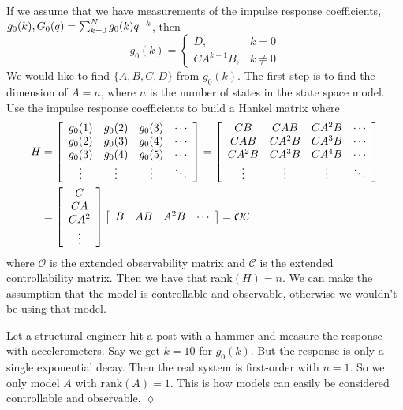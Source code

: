 If we assume that we have measurements of the impulse response coefficients, $g_0(k), G_0(q)=\sum_{k=0}^N g_0(k)q^{-k}$, then
$$g_0(k) = \begin{cases} D, & k=0 \\ CA^{k-1}B, & k\neq0 \end{cases}$$
We would like to find $\{A,B,C,D\}$ from $g_0(k)$. The first step is to find the dimension of $A=n$, where $n$ is the number of states in the state space model. Use the impulse response coefficients to build a Hankel matrix where
\begin{align*}
H &= \left[\begin{array}{c c c c} g_0(1) & g_0(2) & g_0(3) & \cdots \\ g_0(2) & g_0(3) & g_0(4) & \cdots \\ g_0(3) & g_0(4) & g_0(5) & \cdots \\ \vdots & \vdots & \vdots & \ddots \end{array}\right]
= \left[\begin{array}{c c c c} CB & CAB & CA^2B & \cdots \\ CAB & CA^2B & CA^3B & \cdots \\ CA^2B & CA^3B & CA^4B & \cdots \\ \vdots & \vdots & \vdots & \ddots \end{array}\right] \\
&= \left[\begin{array}{c} C \\ CA \\ CA^2 \\ \vdots \end{array}\right] \left[\begin{array}{c c c c} B & AB & A^2B & \cdots \end{array}\right] = \mathcal{O}\mathcal{C}
\end{align*}
where $\mathcal{O}$ is the extended observability matrix and $\mathcal{C}$ is the extended controllability matrix. Then we have that $\text{rank}(H)=n$. We can make the assumption that the model is controllable and observable, otherwise we wouldn't be using that model.

\begin{example}
Let a structural engineer hit a post with a hammer and measure the response with accelerometers. Say we get $k=10$ for $g_0(k)$. But the response is only a single exponential decay. Then the real system is first-order with $n=1$. So we only model $A$ with $\text{rank}(A)=1$. This is how models can easily be considered controllable and observable.
$\lozenge$
\end{example}

